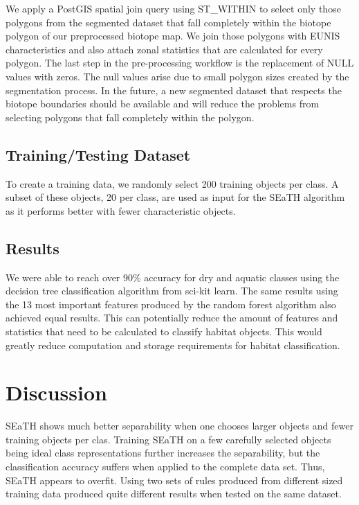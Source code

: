 \documentclass[authoryear, review,12pt,number]{elsarticle}
\begin{document}

We apply a PostGIS spatial join query using ST\_WITHIN to select only those
polygons from the segmented dataset that fall completely within the biotope polygon of our preprocessed
biotope map. We join those polygons
with EUNIS characteristics and also attach zonal statistics that are calculated
for every polygon. The last step in the pre-processing workflow is the
replacement of NULL values with zeros. The null values arise due to small
polygon sizes created by the segmentation process. In the future, a new
segmented dataset that respects the biotope boundaries should be available and
will reduce the problems from selecting polygons that fall completely within the
polygon.


\subsection{Training/Testing Dataset}
To create a training data, we randomly select 200 training objects per class. A
subset of these objects, 20 per class, are used as input for the SEaTH
algorithm as it performs better with fewer characteristic objects.


\subsection{Results}

We were able to reach over 90\% accuracy for dry and aquatic classes using the
decision tree classification algorithm from sci-kit learn. The same results
using the 13 most important features produced by the random forest algorithm
also achieved equal results. This can potentially reduce the amount of features
and statistics that need to be calculated to classify habitat objects. This
would greatly reduce computation and storage requirements for habitat
classification.

\section{Discussion}
SEaTH shows much better separability when one chooses larger objects and fewer
training objects per clas. Training SEaTH on a few carefully selected objects
being ideal class representations further increases the separability, but the classification
accuracy suffers when applied to the complete data set. Thus, SEaTH appears to
overfit. Using two sets of rules produced from different sized training data
produced quite different results when tested on the same dataset.
\end{document}
